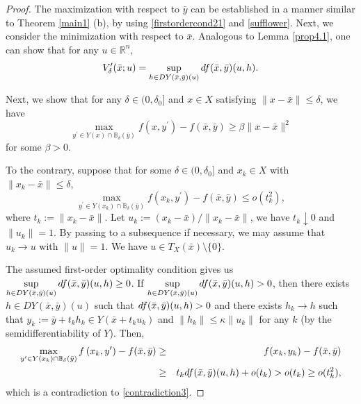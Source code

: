 \documentclass[10pt,a4paper]{amsart}
\begin{document}
\begin{proof}
The maximization with respect to $\bar y$ can be established in a manner similar to Theorem \ref{main1} (b), by using \eqref{firstordercond21} and \eqref{sufflower}. 
	Next, we consider the minimization with respect to $\bar x$. 
	Analogous to Lemma \ref{prop4.1}, one can show that  for any $u \in \mathbb{R}^n$,
	$$V^{\prime}_{\delta}(\bar x;u) = \sup\limits_{h \in D Y(\bar x,\bar y)(u)} {\rm d} f(\bar x,\bar y)(u,h).$$

Next, we show that for any $\delta \in (0,\delta_0]$ and $x \in X$ satisfying $\|x-\bar x\| \leq \delta$, we have
\begin{equation}\label{second-order-growth3} \max _{y^{\prime}  \in  Y(x)\cap \mathbb{B}_\delta(\bar y)} f\left(x, y^{\prime}\right) - f(\bar x,\bar y) \geq \beta \|x-\bar x\|^2\end{equation}
for some $\beta > 0$.


To the contrary, suppose that for some $\delta \in (0,\delta_0]$ and $x_k \in X$  with $\|x_k-\bar x\| \leq \delta$,
\begin{equation}\label{contradiction3}
	\max _{y^{\prime}  \in  Y(x_k)\cap \mathbb{B}_\delta(\bar y)} f\left(x_k, y^{\prime}\right)-f(\bar x,\bar y) \leq o(t_k^2),
\end{equation}
where $t_k:= \|x_k-\bar x\|$. Let $u_k:=(x_k-\bar x)/\|x_k-\bar x\|$, we have $t_k\downarrow 0$ and $\|u_k\|=1$. By passing to a subsequence if necessary, we may assume that $u_k \to u$ with $\|u\|=1$. We have $u \in T_{X}(\bar x) \setminus \{0\}$.

The assumed first-order optimality condition gives us $\sup\limits_{h \in D Y(\bar x,\bar y)(u)} {\rm d} f(\bar x,\bar y)(u,h) \geq 0$.
If $\sup\limits_{h \in D Y(\bar x,\bar y)(u)} {\rm d} f(\bar x,\bar y)(u,h) >0$,
then there exists $h \in D Y(\bar x,\bar y)(u)$ such that ${\rm d} f(\bar x,\bar y)(u,h) >0$ and there exists $h_k \to h$ such that $y_k:=\bar y+t_kh_k \in Y(\bar x+t_ku_k)$ and $\|h_k\| \leq \kappa \|u_k\|$ for any $k$ (by the semidifferentiability of $Y$). Then,
\begin{eqnarray*}\max _{y^{\prime}  \in  Y(x_k)\cap \mathbb{B}_{\delta}(\bar y)} f\left(x_k, y^{\prime}\right)-f(\bar x,\bar y) & \geq & f(x_k,y_k)-f(\bar x,\bar y)\\
&  \geq & t_k {\rm d} f(\bar x,\bar y)(u,h) +o(t_k) > o(t_k) \geq o(t_k^2),\end{eqnarray*}
which is a contradiction to \eqref{contradiction3}.


\end{proof}
\end{document}
